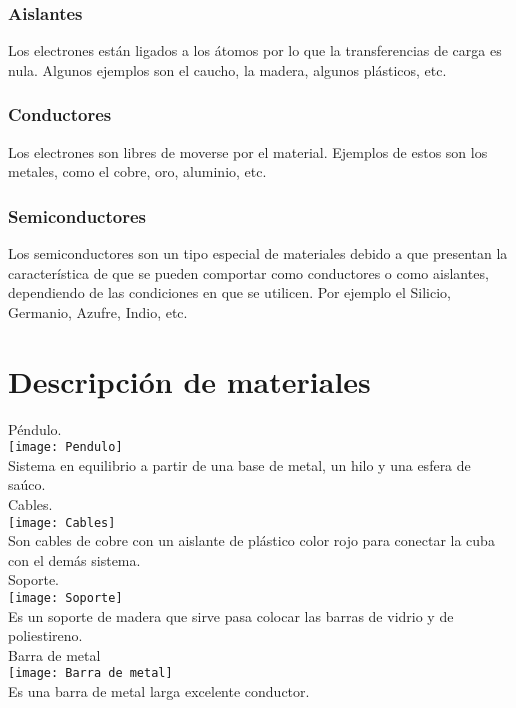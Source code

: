 \documentclass[spanish,10pt,a4paper,onecolumn]{article}
\begin{document}
\subsubsection{Aislantes}
Los electrones están ligados a los átomos por lo que la transferencias de carga es nula. Algunos ejemplos son el caucho, la madera, algunos plásticos, etc. 
\subsubsection{Conductores}
Los electrones son libres de moverse por el material. Ejemplos de estos son los metales, como el cobre, oro, aluminio, etc.
\subsubsection{Semiconductores}
Los semiconductores son un tipo especial de materiales debido a que
presentan la característica de que se pueden comportar como conductores
o como aislantes, dependiendo de las condiciones en que se utilicen. Por ejemplo el Silicio, Germanio, Azufre, Indio, etc. 

\section{Descripción de materiales}
Péndulo.\\

\texttt{[image: Pendulo]}\\
Sistema en equilibrio a partir de una base de metal, un hilo y una esfera de saúco.\\

Cables.\\ 

\texttt{[image: Cables]}\\
Son cables de cobre con un aislante de plástico color rojo para conectar la cuba con el demás sistema.\\ 

Soporte.\\


\texttt{[image: Soporte]}\\
Es un soporte de madera que sirve pasa colocar las barras de vidrio y de poliestireno.\\ 

Barra de metal \\

\texttt{[image: Barra de metal]}\\
Es una barra de metal larga excelente conductor.\\ 
\end{document}

